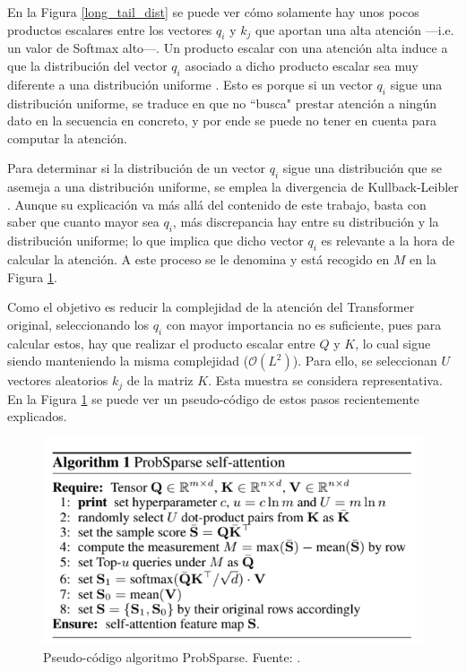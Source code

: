 En la Figura \ref{long_tail_dist} se puede ver cómo solamente hay unos pocos productos escalares entre los vectores $q_i$ y $k_j$ que aportan una alta atención ---i.e. un valor de Softmax alto---. Un producto escalar con una atención alta induce a que la distribución del vector $q_i$ asociado a dicho producto escalar sea muy diferente a una distribución uniforme \parencite{informer}. Esto es porque si un vector $q_i$ sigue una distribución uniforme, se traduce en que no ``busca" prestar atención a ningún dato en la secuencia en concreto, y por ende se puede no tener en cuenta para computar la atención. 


Para determinar si la distribución de un vector $q_i$ sigue una distribución que se asemeja a una distribución uniforme, se emplea la divergencia de Kullback-Leibler \parencite{KL}. Aunque su explicación va más allá del contenido de este trabajo, basta con saber que cuanto mayor sea $q_i$, más discrepancia hay entre su distribución y la distribución uniforme; lo que implica que dicho vector $q_i$ es relevante a la hora de calcular la atención. A este proceso se le denomina  y está recogido en $M$ en la Figura \ref{probSparse}.

Como el objetivo es reducir la complejidad de la atención del Transformer original, seleccionando los $q_i$ con mayor importancia no es suficiente, pues para calcular estos, hay que realizar el producto escalar entre $Q$ y $K$, lo cual sigue siendo manteniendo la misma complejidad ($\mathcal{O}(L ^2)$). Para ello, se seleccionan $U$ vectores aleatorios $k_j$ de la matriz $K$. Esta muestra se considera representativa. En la Figura \ref{probSparse} se puede ver un pseudo-código de estos pasos recientemente explicados.
\begin{figure}[H]
    \centering
    \includegraphics{imgs/probSparse.png}
    \caption{Pseudo-código algoritmo 
    	ProbSparse. \scriptsize{Fuente: \parencite{informer}}.}
    \label{probSparse}
\end{figure}

